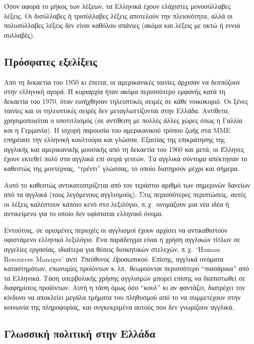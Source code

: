 \begin{multicols}{2}
Όσον αφορά το μήκος των λέξεων, τα Ελληνικά έχουν ελάχιστες μονοσύλλαβες λέξεις. Οι δισύλλαβες ή τρισύλλαβες λέξεις αποτελούν την πλειονότητα, αλλά οι πολυσύλλαβες λέξεις δεν είναι καθόλου σπάνιες (ακόμα και λέξεις με οκτώ ή εννιά συλλαβές).

\subsection{Πρόσφατες εξελίξεις}

Από τη δεκαετία του 1950 κι έπειτα, οι αμερικανικές ταινίες άρχισαν να δεσπόζουν στην ελληνική αγορά. Η κυριαρχία ήταν ακόμα περισσότερο εμφανής κατά τη δεκαετία του 1970, όταν εισήχθησαν τηλεοπτικές σειρές σε κάθε νοικοκυριό. Οι ξένες ταινίες και οι τηλεοπτικές σειρές δεν μεταγλωττίζονται στην Ελλάδα. Αντίθετα, χρησιμοποιείται ο υποτιτλισμός (σε αντίθεση με πολλές άλλες χώρες όπως η Γαλλία και η Γερμανία). Η ισχυρή παρουσία του αμερικανικού τρόπου ζωής στα ΜΜΕ επηρέασε την ελληνική κουλτούρα και γλώσσα. Εξαιτίας της επικράτησης της αγγλικής και αμερικανικής μουσικής από τη δεκαετία του 1960 και μετά, οι Έλληνες έχουν εκτεθεί πολύ στα αγγλικά επί σειρά γενεών. Τα αγγλικά σύντομα απέκτησαν το καθεστώς της μοντέρνας, “τρέντι” γλώσσας, το οποίο διατηρούν μέχρι και σήμερα. 

Αυτό το καθεστώς αντικατοπτρίζεται από τον τεράστιο αριθμό των σημερινών δανείων από τα αγγλικά (τους λεγόμενους αγγλισμούς). Στις περισσότερες περιπτώσεις, αυτές οι λέξεις καλύπτουν κάποιο κενό στο λεξιλόγιο, π.\,χ.~ονομάζουν μια νέα ιδέα ή αντικείμενο για το οποίο δεν υφίσταται ελληνικό όνομα.

Εντούτοις, σε ορισμένες περιοχές οι αγγλισμοί έχουν αρχίσει να αντικαθιστούν υφιστάμενο ελληνικό λεξιλόγιο. Ένα παράδειγμα είναι η χρήση αγγλικών τίτλων σε αγγελίες εργασίας, ιδιαίτερα για θέσεις διοικητικών στελεχών, π.\,χ.~`Human Resources Manager' αντί \textit{Υπεύθυνος Προσωπικού}. Επίσης, αγγλικά ονόματα καταστημάτων, επωνυμίες προϊόντων κ.\,λπ.~θεωρούνται περισσότερο “πιασάρικα” από τα Ελληνικά. Τάση υπερβολικής χρήσης αγγλισμών μπορεί επίσης να διαπιστωθεί σε διαφημίσεις προϊόντων. Αυτή η τάση όμως όσο “κουλ” κι αν φαντάζει, διατρέχει τον κίνδυνο να αποκλείει μεγάλα τμήματα του πληθυσμού από το να συμμετέχουν στην κοινωνία της πληροφορίας, και συγκεκριμένα αυτούς που δεν γνωρίζουν αγγλικά.

\subsection{Γλωσσική πολιτική στην Ελλάδα}


\end{multicols}
